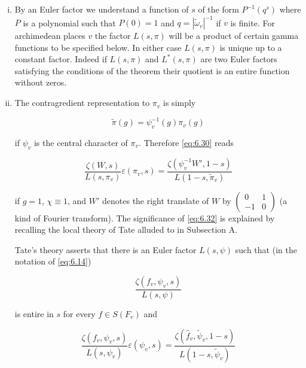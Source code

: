 \begin{remark}\label{rem:6.13}

\begin{enumerate}[(i)]

\item By an Euler factor we understand a function of $s$ of the form $P^{-1}(q^s)$ where $P$ is a polynomial such that $P(0) = 1$ and $q = |\tilde{\omega}_v|^{-1}$ if $v$ is finite. For archimedean places $v$ the factor $L(s, \pi)$ will be a product of certain gamma functions to be specified below. In either case $L(s, \pi)$ is unique up to a constant factor. Indeed if $L(s, \pi)$ and $L^*(s, \pi)$ are two Euler factors satisfying the conditions of the theorem their quotient is an entire function without zeros.

\item The contragredient representation to $\pi_v$ is simply

\begin{equation}\label{eq:6.31}
\tilde{\pi}(g) = \psi_v^{-1}(g)\pi_v(g)\tag{6.31}
\end{equation}

if $\psi_v$ is the central character of $\pi_v$. Therefore \eqref{eq:6.30} reads

\begin{equation}\label{eq:6.32}
\frac{\zeta(W, s)}{L(s, \pi_v)} \varepsilon(\pi_v, s) = \frac{\zeta(\psi_v^{-1}W', 1 - s)}{L(1 - s, \tilde{\pi}_v)}\tag{6.32}
\end{equation}

if $g = 1$, $\chi \equiv 1$, and $W'$ denotes the right translate of $W$ by $\begin{pmatrix} 0 & 1 \\ -1 & 0 \end{pmatrix}$ (a kind of Fourier transform). The significance of \eqref{eq:6.32} is explained by recalling the local theory of Tate alluded to in Subsection A.

Tate's theory asserts that there is an Euler factor $L(s, \psi)$ such that (in the notation of \eqref{eq:6.14})

\[
\frac{\zeta(f_v, \psi_v, s)}{L(s, \psi)}
\]

is entire in $s$ for every $f \in S(F_v)$ and

\begin{equation}\label{eq:6.33}
\frac{\zeta(f_v, \psi_v, s)}{L(s, \psi_v)} \varepsilon(\psi_v, s) = \frac{\zeta(\hat{f}_v, \tilde{\psi}_v, 1 - s)}{L(1 - s, \tilde{\psi}_v)}\tag{6.33}
\end{equation}


\end{enumerate}
\end{remark}

